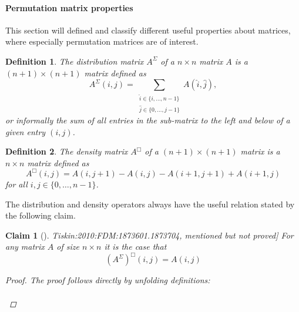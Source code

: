\documentclass[twoside,11pt,openright]{report}
\newcommand{\reftiskin}[2]{\cite[#1]{Tiskin:2010:FDM:1873601.1873704}, #2}
\newtheorem{mydef}{Definition}
\newtheorem{claim}{Claim}
\begin{document}
\paragraph{Permutation matrix properties}
This section will defined and classify different useful properties about matrices, where especially permutation matrices are of interest. 
%
\begin{mydef}
  The distribution matrix $A^{\Sigma}$ of a $n \times n$ matrix $A$ is a $(n + 1) \times (n + 1)$ matrix defined as
  \[
    A^{\Sigma}(i, j) = \sum_{\substack{\hat{i} \in \{i, \dots, n - 1\} \\ \hat{j} \in \{0, \dots, j - 1\}}} {A(\hat{i}, \hat{j})},
  \]
  or informally the sum of all entries in the sub-matrix to the left and below of a given entry $(i, j)$.
\end{mydef}
%
\begin{mydef}
  The density matrix $A^{\Box}$ of a $(n + 1) \times (n + 1)$ matrix is a $n \times n$ matrix defined as
  \[
    A^{\Box}(i, j) = A(i, j + 1) - A(i, j) - A(i + 1, j + 1) + A(i + 1, j)
  \]
  for all $i, j \in \{ 0, \dots, n - 1 \}$.
\end{mydef}%
The distribution and density operators always have the useful relation stated by the following claim.
\begin{claim}[\reftiskin{p. 1288}{mentioned but not proved}]
  \label{claim:sigma-box-identity}
  For any matrix $A$ of size $n \times n$ it is the case that
  \[
    (A^{\Sigma})^{\Box}(i, j) = A(i, j)
  \]
  \begin{proof}
    The proof follows directly by unfolding definitions:\\
    \\
  \end{proof}
\end{claim}
\end{document}
